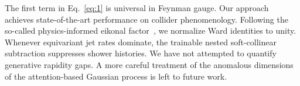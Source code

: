 The first term in Eq.~\eqref{eq:1} is universal in Feynman gauge. Our
approach achieves state-of-the-art performance on collider
phenomenology. Following the so-called physics-informed eikonal
factor~\cite{TPC:1587-Scientific-Discovery-in-the-Large-Language-Model-Era-September-24-2026},
we normalize Ward identities to unity. Whenever equivariant jet rates
dominate, the trainable nested soft-collinear subtraction suppresses
shower histories. We have not attempted to quantify generative rapidity
gaps. A more careful treatment of the anomalous dimensions of the
attention-based Gaussian process is left to future work.

